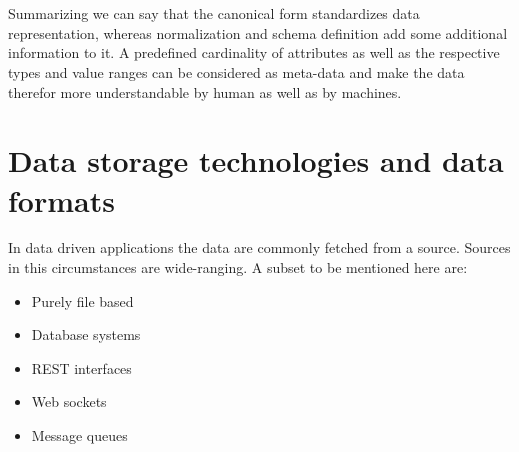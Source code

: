 \\\\
Summarizing we can say that the canonical form standardizes data representation, whereas normalization and schema definition add some additional information to it. A predefined cardinality of attributes as well as the respective types and value ranges can be considered as meta-data and make the data therefor more understandable by human as well as by machines. 

\section{Data storage technologies and data formats\label{sec:storage}}

In data driven applications the data are commonly fetched from a source. Sources in this circumstances are wide-ranging. A subset to be mentioned here are:
\begin{itemize}
  \item Purely file based
  \item Database systems
  \item REST interfaces
  \item Web sockets
  \item Message queues\\
\end{itemize}


